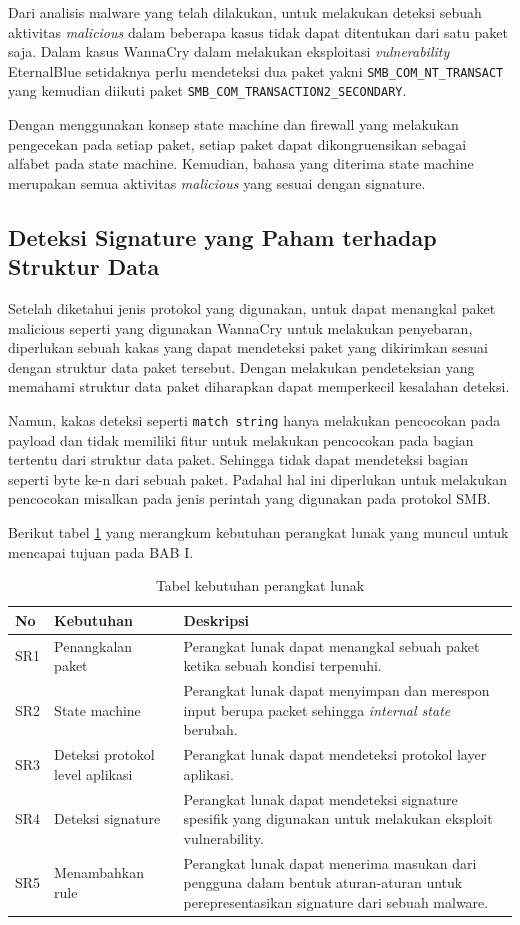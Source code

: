 Dari analisis malware yang telah dilakukan, untuk melakukan deteksi sebuah aktivitas \textit{malicious} dalam beberapa kasus tidak dapat ditentukan dari satu paket saja. Dalam kasus WannaCry dalam melakukan eksploitasi \textit{vulnerability} EternalBlue setidaknya perlu mendeteksi dua paket yakni \verb|SMB_COM_NT_TRANSACT| yang kemudian diikuti paket \verb|SMB_COM_TRANSACTION2_SECONDARY|.

Dengan menggunakan konsep state machine dan firewall yang melakukan pengecekan pada setiap paket, setiap paket dapat dikongruensikan sebagai alfabet pada state machine. Kemudian, bahasa yang diterima state machine merupakan semua aktivitas \textit{malicious} yang sesuai dengan signature.

\subsection{Deteksi Signature yang Paham terhadap Struktur Data}

Setelah diketahui jenis protokol yang digunakan, untuk dapat menangkal paket malicious seperti yang digunakan WannaCry untuk melakukan penyebaran, diperlukan sebuah kakas yang dapat mendeteksi paket yang dikirimkan sesuai dengan struktur data paket tersebut. Dengan melakukan pendeteksian yang memahami struktur data paket diharapkan dapat memperkecil kesalahan deteksi.

Namun, kakas deteksi seperti \verb|match string| hanya melakukan pencocokan pada payload dan tidak memiliki fitur untuk melakukan pencocokan pada bagian tertentu dari struktur data paket. Sehingga tidak dapat mendeteksi bagian seperti byte ke-n dari sebuah paket. Padahal hal ini diperlukan untuk melakukan pencocokan misalkan pada jenis perintah yang digunakan pada protokol SMB.

Berikut tabel \ref{table:software_requirement} yang merangkum kebutuhan perangkat lunak yang muncul untuk mencapai tujuan pada BAB I.

\begin{table}[H]
	\caption{Tabel kebutuhan perangkat lunak}
	\label{table:software_requirement}
	\begin{tabularx}{\textwidth}{|l|X|X|}
		\hline
		\textbf{No} & \textbf{Kebutuhan} & \textbf{Deskripsi} \\ \hline
		SR1 & Penangkalan paket & Perangkat lunak dapat menangkal sebuah paket ketika sebuah kondisi terpenuhi. \\ \hline 
		SR2 & State machine & Perangkat lunak dapat menyimpan dan merespon input berupa packet sehingga \textit{internal state} berubah. \\ \hline
		SR3 & Deteksi protokol level aplikasi & Perangkat lunak dapat mendeteksi protokol layer aplikasi. \\ \hline
		SR4 & Deteksi signature & Perangkat lunak dapat mendeteksi signature spesifik yang digunakan untuk melakukan eksploit vulnerability.\\ \hline
		SR5 & Menambahkan rule & Perangkat lunak dapat menerima masukan dari pengguna dalam bentuk aturan-aturan untuk perepresentasikan signature dari sebuah malware.\\ \hline
	\end{tabularx}
\end{table}

